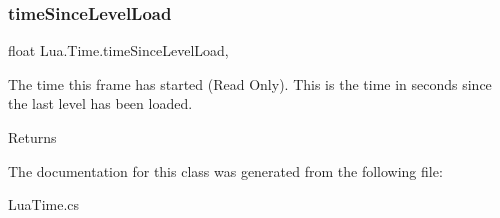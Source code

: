 \subsubsection{\texorpdfstring{timeSinceLevelLoad}{timeSinceLevelLoad}}
{\footnotesize\ttfamily float Lua.\+Time.\+time\+Since\+Level\+Load\hspace{0.3cm}{\ttfamily [static]}, {\ttfamily [get]}}



The time this frame has started (Read Only). This is the time in seconds since the last level has been loaded. 

\begin{DoxyReturn}{Returns}

\end{DoxyReturn}


The documentation for this class was generated from the following file\+:\begin{DoxyCompactItemize}
\item 
Lua\+Time.\+cs\end{DoxyCompactItemize}
